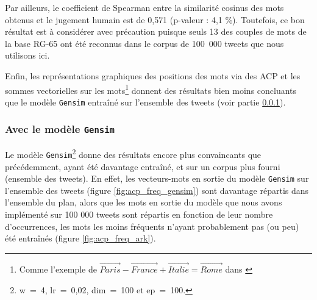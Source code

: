 \documentclass[11pt,french,french]{article}
\let\rmarkdownfootnote\footnote%
\def\footnote{\protect\rmarkdownfootnote}
\begin{document}
Par ailleurs, le coefficient de Spearman entre la similarité cosinus des
mots obtenus et le jugement humain est de 0,571 (p-valeur : 4,1 \%).
Toutefois, ce bon résultat est à considérer avec précaution puisque
seuls 13 des couples de mots de la base RG-65 ont été reconnus dans le
corpus de 100~000 tweets que nous utilisons ici.

Enfin, les représentations graphiques des positions des mots via des ACP
et les sommes vectorielles sur les mots\footnote{Comme l'exemple de
  \(\overrightarrow{Paris} - \overrightarrow{France} + \overrightarrow{Italie} = \overrightarrow{Rome}\)
  dans \cite{Mikolov}} donnent des résultats bien moins concluants que
le modèle \texttt{Gensim} entraîné sur l'ensemble des tweets (voir
partie \ref{sec:gensimresultats}).

\subsubsection{\texorpdfstring{Avec le modèle
\texttt{Gensim}}{Avec le modèle Gensim}}\label{sec:gensimresultats}

Le modèle \texttt{Gensim}\footnote{w~=~4, lr~=~0,02, dim~=~100 et
  ep~=~100.} donne des résultats encore plus convaincants que
précédemment, ayant été davantage entraîné, et sur un corpus plus fourni
(ensemble des tweets). En effet, les vecteurs-mots en sortie du modèle
\texttt{Gensim} sur l'ensemble des tweets (figure
\ref{fig:acp_freq_gensim}) sont davantage répartis dans l'ensemble du
plan, alors que les mots en sortie du modèle que nous avons implémenté
sur 100 000 tweets sont répartis en fonction de leur nombre
d'occurrences, les mots les moins fréquents n'ayant probablement pas (ou
peu) été entraînés (figure \ref{fig:acp_freq_ark}).
\end{document}
